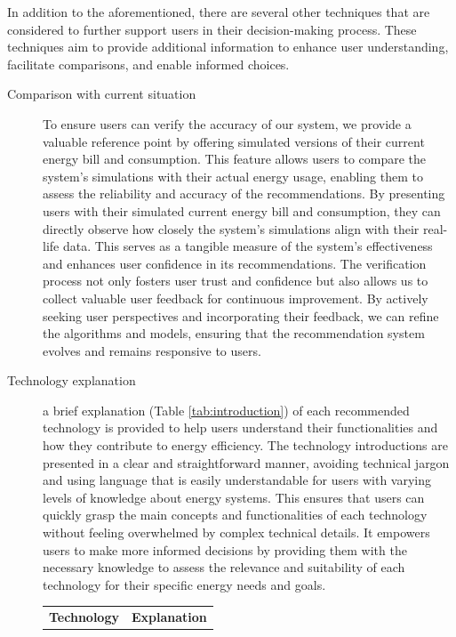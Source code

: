 In addition to the aforementioned, there are several other techniques that are considered to further support users in their decision-making process. 
These techniques aim to provide additional information to enhance user understanding, facilitate comparisons, and enable informed choices. 
\begin{description}
  \item[Comparison with current situation] To ensure users can verify the accuracy of our system, we provide a valuable reference point by offering simulated versions of their current energy bill and consumption. 
    This feature allows users to compare the system's simulations with their actual energy usage, enabling them to assess the reliability and accuracy of the recommendations. 
    By presenting users with their simulated current energy bill and consumption, they can directly observe how closely the system's simulations align with their real-life data. 
    This serves as a tangible measure of the system's effectiveness and enhances user confidence in its recommendations. 
    The verification process not only fosters user trust and confidence but also allows us to collect valuable user feedback for continuous improvement.
    By actively seeking user perspectives and incorporating their feedback, we can refine the algorithms and models, ensuring that the recommendation system evolves and remains responsive to users. 
  \item[Technology explanation] a brief explanation (Table \ref{tab:introduction}) of each recommended technology is provided to help users understand their functionalities and how they contribute to energy efficiency. 
    The technology introductions are presented in a clear and straightforward manner, avoiding technical jargon and using language that is easily understandable for users with varying levels of knowledge about energy systems. This ensures that users can quickly grasp the main concepts and functionalities of each technology without feeling overwhelmed by complex technical details.
    It empowers users to make more informed decisions by providing them with the necessary knowledge to assess the relevance and suitability of each technology for their specific energy needs and goals.
    \begin{center}
      \begin{table}[h!]
        \scriptsize
          \begin{tabular}{ | p{} | p{} | }
            \hline  
            \textbf{Technology} & \textbf{Explanation} \\

\end{tabular}
\end{table}
\end{center}
\end{description}
